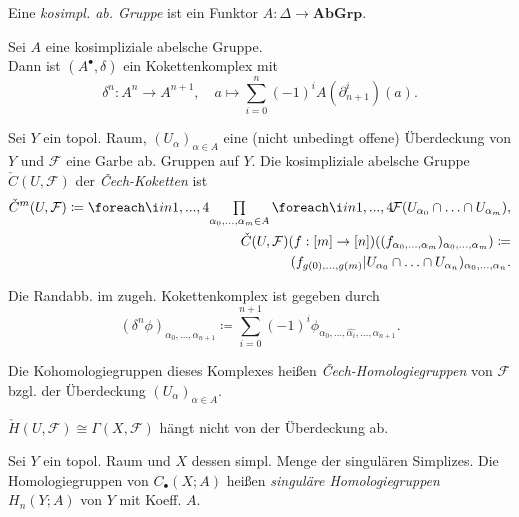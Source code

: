 \documentclass{cheat-sheet}
\newcommand{\nspace}[1]{\foreach \i in {1,...,#1}{ \! }} %
\newcommand{\AbGrp}{\mathbf{AbGrp}} %
\newcommand{\CC}[1]{{#1}_{\bullet}} %
\newcommand{\Fais}{\mathcal{F}} %
\begin{document}
\begin{defn}
  Eine \emph{kosimpl. ab. Gruppe} ist ein Funktor
  $A : \Delta \to \AbGrp$.
\end{defn}

\begin{defn}
  Sei $A$ eine kosimpliziale abelsche Gruppe. \\
  Dann ist $(A^\bullet, \delta)$ ein Kokettenkomplex mit
  \[
    \delta^n : A^n \to A^{n+1}, \quad
    a \mapsto \sum_{i=0}^n (-1)^i A(\partial_{n+1}^i)(a).
  \]
\end{defn}


\begin{defn}
  Sei $Y$ ein topol. Raum, $(U_\alpha)_{\alpha \in A}$ eine (nicht unbedingt offene) Überdeckung von $Y$ und $\Fais$ eine Garbe ab. Gruppen auf $Y$. Die kosimpliziale abelsche Gruppe $\check{C}(U, \Fais)$ der \emph{Čech-Koketten} ist
  \begin{align*}
    \check{C}^m(U, \Fais) \coloneqq \nspace{4} \prod_{\alpha_0, \ldots, \alpha_m \in A} \nspace{4} \Fais(U_{\alpha_0} \cap \ldots \cap U_{\alpha_m}), \\
    \check{C}(U, \Fais)(f : [m] \to [n])((f_{\alpha_0, \ldots ,\alpha_m})_{\alpha_0, \ldots, \alpha_m}) \coloneqq \\
    (f_{g(0), \ldots, g(m)}|U_{\alpha_0} \cap \ldots \cap U_{\alpha_n})_{\alpha_0, \nldots, \alpha_n}.
  \end{align*}
\end{defn}

\begin{bem}
  Die Randabb. im zugeh. Kokettenkomplex ist gegeben durch
  \[ (\delta^n \phi)_{\alpha_0, \ldots, \alpha_{n+1}} \coloneqq \sum_{i=0}^{n+1} (-1)^i \phi_{\alpha_0, \ldots, \hat{\alpha_i}, \ldots, \alpha_{n+1}}. \]
\end{bem}

\begin{defn}
  Die Kohomologiegruppen dieses Komplexes heißen \emph{Čech-Homologiegruppen} von $\Fais$ bzgl. der Überdeckung $(U_\alpha)_{\alpha \in A}$.
\end{defn}

\begin{bem}
  $\check{H}(U, \Fais) \cong \Gamma(X, \Fais)$ hängt nicht von der Überdeckung ab.
\end{bem}

\begin{defn}
  Sei $Y$ ein topol. Raum und $X$ dessen simpl. Menge der singulären Simplizes.
  Die Homologiegruppen von $\CC{C}(X; A)$ heißen \emph{singuläre Homologiegruppen} $H_n(Y; A)$ von $Y$ mit Koeff. $A$.
\end{defn}
\end{document}
